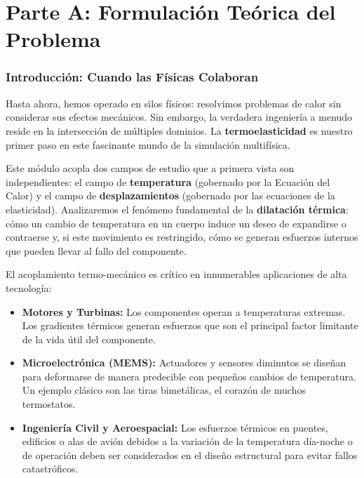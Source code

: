\part*{Parte A: Formulación Teórica del Problema}

\section{Introducción: Cuando las Físicas Colaboran}
Hasta ahora, hemos operado en silos físicos: resolvimos problemas de calor sin considerar sus efectos mecánicos. Sin embargo, la verdadera ingeniería a menudo reside en la intersección de múltiples dominios. La \textbf{termoelasticidad} es nuestro primer paso en este fascinante mundo de la simulación multifísica.

Este módulo acopla dos campos de estudio que a primera vista son independientes: el campo de \textbf{temperatura} (gobernado por la Ecuación del Calor) y el campo de \textbf{desplazamientos} (gobernado por las ecuaciones de la elasticidad). Analizaremos el fenómeno fundamental de la \textbf{dilatación térmica}: cómo un cambio de temperatura en un cuerpo induce un deseo de expandirse o contraerse y, si este movimiento es restringido, cómo se generan esfuerzos internos que pueden llevar al fallo del componente.

\begin{infobox}
    El acoplamiento termo-mecánico es crítico en innumerables aplicaciones de alta tecnología:
    \begin{itemize}
        \item \textbf{Motores y Turbinas:} Los componentes operan a temperaturas extremas. Los gradientes térmicos generan esfuerzos que son el principal factor limitante de la vida útil del componente.
        \item \textbf{Microelectrónica (MEMS):} Actuadores y sensores diminutos se diseñan para deformarse de manera predecible con pequeños cambios de temperatura. Un ejemplo clásico son las tiras bimetálicas, el corazón de muchos termostatos.
        \item \textbf{Ingeniería Civil y Aeroespacial:} Los esfuerzos térmicos en puentes, edificios o alas de avión debidos a la variación de la temperatura día-noche o de operación deben ser considerados en el diseño estructural para evitar fallos catastróficos.
    \end{itemize}
\end{infobox}

